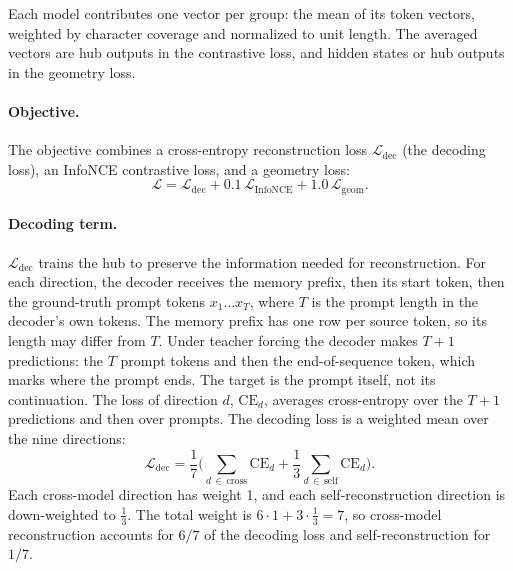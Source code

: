 Each model contributes one vector per group: the mean of its token vectors, weighted by character coverage and normalized to unit length.
The averaged vectors are hub outputs in the contrastive loss, and hidden states or hub outputs in the geometry loss.

\paragraph{Objective.} The objective combines a cross-entropy reconstruction loss $\mathcal{L}_{\text{dec}}$ (the decoding loss), an InfoNCE contrastive loss, and a geometry loss:
\begin{equation}
\mathcal{L} = \mathcal{L}_{\text{dec}} + 0.1\,\mathcal{L}_{\text{InfoNCE}} + 1.0\,\mathcal{L}_{\text{geom}} .
\label{eq:hub:loss}
\end{equation}

\paragraph{Decoding term.} $\mathcal{L}_{\text{dec}}$ trains the hub to preserve the information needed for reconstruction.
For each direction, the decoder receives the memory prefix, then its start token, then the ground-truth prompt tokens $x_1 \ldots x_T$, where $T$ is the prompt length in the decoder's own tokens.
The memory prefix has one row per source token, so its length may differ from $T$.
Under teacher forcing the decoder makes $T+1$ predictions: the $T$ prompt tokens and then the end-of-sequence token, which marks where the prompt ends.
The target is the prompt itself, not its continuation.
The loss of direction $d$, $\text{CE}_d$, averages cross-entropy over the $T+1$ predictions and then over prompts. %
The decoding loss is a weighted mean over the nine directions:
\begin{equation}
\mathcal{L}_{\text{dec}} = \frac{1}{7}\Big(\sum_{d\,\in\,\text{cross}} \text{CE}_d + \frac{1}{3}\sum_{d\,\in\,\text{self}} \text{CE}_d\Big).
\label{eq:hub:dec}
\end{equation}
Each cross-model direction has weight 1, and each self-reconstruction direction is down-weighted to $\tfrac{1}{3}$. %
The total weight is $6\cdot 1 + 3\cdot\tfrac{1}{3} = 7$, so cross-model reconstruction accounts for $6/7$ of the decoding loss and self-reconstruction for $1/7$.

